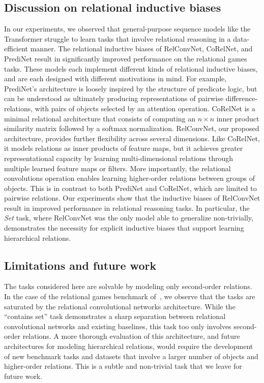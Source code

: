 \subsection*{Discussion on relational inductive biases}
In our experiments, we observed that general-purpose sequence models like the Transformer struggle to learn tasks that involve relational reasoning in a data-efficient manner. The relational inductive biases of RelConvNet, CoRelNet, and PrediNet result in significantly improved performance on the relational games tasks. These models each implement different kinds of relational inductive biases, and are each designed with different motivations in mind. For example, PrediNet's architecture is loosely inspired by the structure of predicate logic, but can be understood as ultimately producing representations of pairwise difference-relations, with pairs of objects selected by an attention operation. CoRelNet is a minimal relational architecture that consists of computing an $n \times n$ inner product similarity matrix followed by a softmax normalization. RelConvNet, our proposed architecture, provides further flexibility across several dimensions. Like CoRelNet, it models relations as inner products of feature maps, but it achieves greater representational capacity by learning multi-dimensional relations through multiple learned feature maps or filters. More importantly, the relational convolutions operation enables learning higher-order relations between groups of objects. This is in contrast to both PrediNet and CoRelNet, which are limited to pairwise relations. Our experiments show that the inductive biases of RelConvNet result in improved performance in relational reasoning tasks. In particular, the \textit{Set} task, where RelConvNet was the only model able to generalize non-trivially, demonstrates the necessity for explicit inductive biases that support learning hierarchical relations.

\subsection*{Limitations and future work}
The tasks considered here are solvable by modeling only second-order relations. In the case of the relational games benchmark of~\citet{shanahanExplicitlyRelationalNeural}, we observe that the tasks are saturated by the relational convolutional networks architecture. While the ``contains set'' task demonstrates a sharp separation between relational convolutional networks and existing baselines, this task too only involves second-order relations.
A more thorough evaluation of this architecture, and future architectures for modeling hierarchical relations, would require the development of new benchmark tasks and datasets that involve a larger number of objects and higher-order relations. This is a subtle and non-trivial task that we leave for future work.


